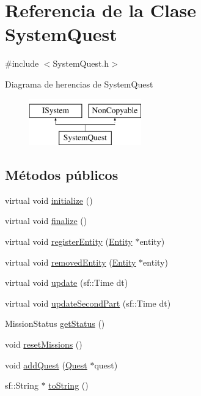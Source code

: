 \hypertarget{classSystemQuest}{}\section{Referencia de la Clase System\+Quest}
\label{classSystemQuest}


{\ttfamily \#include $<$System\+Quest.\+h$>$}

Diagrama de herencias de System\+Quest\begin{figure}[H]
\begin{center}
\leavevmode
\includegraphics[height=2.000000cm]{classSystemQuest}
\end{center}
\end{figure}
\subsection*{Métodos públicos}
\begin{DoxyCompactItemize}
\item 
virtual void \hyperlink{classSystemQuest_a48773430521559d0b5eaa931b53d8892}{initialize} ()
\item 
virtual void \hyperlink{classSystemQuest_a3c9f834570acf2277d4620e3ba16992d}{finalize} ()
\item 
virtual void \hyperlink{classSystemQuest_a03ce5db7875898ebae8c9424c1888c37}{register\+Entity} (\hyperlink{classEntity}{Entity} $\ast$entity)
\item 
virtual void \hyperlink{classSystemQuest_a588e9982c16288af4675b67bf9177080}{removed\+Entity} (\hyperlink{classEntity}{Entity} $\ast$entity)
\item 
virtual void \hyperlink{classSystemQuest_a76892fc5b11bdb7132e7499e46eb7977}{update} (sf\+::\+Time dt)
\item 
virtual void \hyperlink{classSystemQuest_a3069bdc81a590c47c4479b63add3fc3d}{update\+Second\+Part} (sf\+::\+Time dt)
\item 
Mission\+Status \hyperlink{classSystemQuest_a6469f12a86c708f7661482aad85b1de7}{get\+Status} ()
\item 
void \hyperlink{classSystemQuest_a3c0fb20076dcca040623e9c1f72e3ecf}{reset\+Missions} ()
\item 
void \hyperlink{classSystemQuest_aca9a6f845d267fc9ef58d6531b341094}{add\+Quest} (\hyperlink{classQuest}{Quest} $\ast$quest)
\item 
sf\+::\+String $\ast$ \hyperlink{classSystemQuest_a3c5b341ae4087af5b1a0a0386905bfd7}{to\+String} ()
\end{DoxyCompactItemize}
